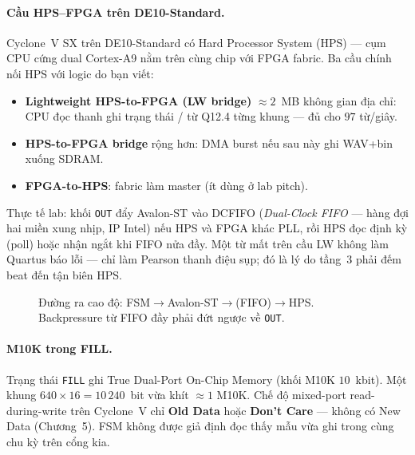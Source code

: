 \paragraph{Cầu HPS--FPGA trên DE10-Standard.} Cyclone~V SX trên DE10-Standard có Hard Processor System (HPS) --- cụm CPU cứng dual Cortex-A9 nằm trên cùng chip với FPGA fabric. Ba cầu chính nối HPS với logic do bạn viết:
\begin{itemize}[leftmargin=1.4em]
  \item \textbf{Lightweight HPS-to-FPGA (LW bridge)} $\approx 2$~MB không gian địa chỉ: CPU đọc thanh ghi trạng thái / từ Q12.4 từng khung --- đủ cho $97$ từ/giây.
  \item \textbf{HPS-to-FPGA bridge} rộng hơn: DMA burst nếu sau này ghi WAV+bin xuống SDRAM.
  \item \textbf{FPGA-to-HPS}: fabric làm master (ít dùng ở lab pitch).
\end{itemize}
Thực tế lab: khối \texttt{OUT} đẩy Avalon-ST vào DCFIFO (\emph{Dual-Clock FIFO} --- hàng đợi hai miền xung nhịp, IP Intel) nếu HPS và FPGA khác PLL, rồi HPS đọc định kỳ (poll) hoặc nhận ngắt khi FIFO nửa đầy. Một từ mất trên cầu LW không làm Quartus báo lỗi --- chỉ làm Pearson thanh điệu sụp; đó là lý do tầng~3 phải đếm beat đến tận biên HPS.

\begin{figure}[H]
\centering
{}
\caption{Đường ra cao độ: FSM$\to$Avalon-ST$\to$(FIFO)$\to$HPS. Backpressure từ FIFO đầy phải đứt ngược về \texttt{OUT}.}
\label{fig:ch11_hps_bridge}
\end{figure}

\paragraph{M10K trong FILL.} Trạng thái \texttt{FILL} ghi True Dual-Port On-Chip Memory (khối M10K $10$~kbit). Một khung $640\times 16=10\,240$~bit vừa khít $\approx 1$ M10K. Chế độ mixed-port read-during-write trên Cyclone~V chỉ \textbf{Old Data} hoặc \textbf{Don't Care} --- không có New Data (Chương~5). FSM không được giả định đọc thấy mẫu vừa ghi trong cùng chu kỳ trên cổng kia.

